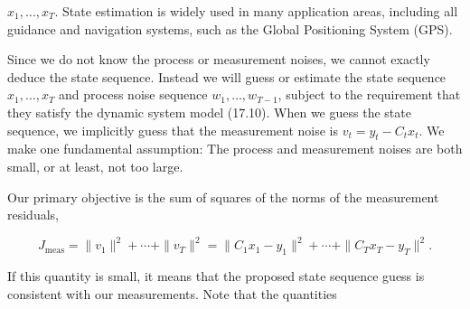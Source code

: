 \(x_{1},\ldots,x_{T}\). State estimation is widely used in many application areas, including all guidance and navigation systems, such as the Global Positioning System (GPS).

Since we do not know the process or measurement noises, we cannot exactly deduce the state sequence. Instead we will guess or estimate the state sequence \(x_{1},\ldots,x_{T}\) and process noise sequence \(w_{1},\ldots,w_{T-1}\), subject to the requirement that they satisfy the dynamic system model (17.10). When we guess the state sequence, we implicitly guess that the measurement noise is \(v_{t}=y_{t}-C_{t}x_{t}\). We make one fundamental assumption: The process and measurement noises are both small, or at least, not too large.

Our primary objective is the sum of squares of the norms of the measurement residuals,

\[J_{\text{meas}}=\|v_{1}\|^{2}+\cdots+\|v_{T}\|^{2}=\|C_{1}x_{1}-y_{1}\|^{2}+ \cdots+\|C_{T}x_{T}-y_{T}\|^{2}.\]

If this quantity is small, it means that the proposed state sequence guess is consistent with our measurements. Note that the quantities 